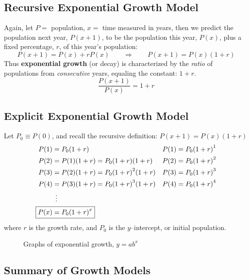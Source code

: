 \subsection{Recursive Exponential Growth Model}%
\label{sec:recursive-exponential}

Again, let \(P=\) population, \(x=\) time measured in years, then we
predict the population next year, \(P(x+1)\), to be the population
this year, \(P(x)\), plus a fixed percentage, \(r\), of this year's
population:
\begin{equation}
  P(x+1) = P(x) + rP(x) \qquad \Rightarrow \qquad
  \boxed{P(x+1) = P(x)(1+r)}
\end{equation}
Thus \textbf{exponential growth} (or decay) is characterized by the
\emph{ratio} of populations from \emph{consecutive} years, equaling
the constant: \(1+r\).
\[
  \boxed{\frac{P(x+1)}{P(x)} = 1+r}
\]

\subsection{Explicit Exponential Growth Model}%
\label{sub:explicit-exponential}

Let \(P_{0}\equiv P(0)\), and recall the recursive definition: \(P(x+1) = P(x)(1+r) \)
\begin{align*}
  P(1) &= P_{0}(1+r) & P(1) &= P_{0}{(1+r)}^{1}\\
  P(2) &= P(1)(1+r) = P_{0}(1+r)(1+r) & P(2) &= P_{0}{(1+r)}^2 \\
  P(3) &= P(2)(1+r) = P_{0}{(1+r)}^2(1+r) & P(3) &= P_{0}{(1+r)}^3 \\
  P(4) &= P(3)(1+r) = P_{0}{(1+r)}^3(1+r) & P(4) &= P_{0}{(1+r)}^4 \\
       & \: \: \vdots &&\\
  \Aboxed{P(x) &= P_0{(1+r)}^x} &&
\end{align*}
where \(r\) is the growth rate, and \(P_0\) is the \(y\)--intercept,
or initial population.
\begin{figure}[b]
  \centering
  
  
  \caption{Graphs of exponential growth, \(y=ab^{x}\)}%
  \label{fig:exponential-growth}
\end{figure}

\newpage

\subsection{Summary of Growth Models}%
\label{sub:summary-growth-models}

